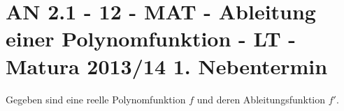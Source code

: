 \section{AN 2.1 - 12 - MAT - Ableitung einer Polynomfunktion - LT - Matura 2013/14 1. Nebentermin}

\begin{beispiel}[AN 2.1]{1} %
				Gegeben sind eine reelle Polynomfunktion $f$ und deren Ableitungsfunktion $f'$.
				
\end{beispiel}